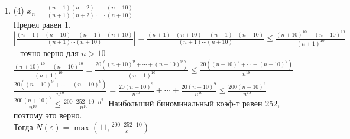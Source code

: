 \documentclass[a4paper]{article}
\def\eps{\varepsilon}
\begin{document}
\begin{enumerate}
\begin{enumerate}
        С $n > 10$ точно выполняется, что знаменатель > 1, поэтому:
        $\ 2|\frac{1 - \sqrt[3]{1 + \frac{2}{n} - \frac{1}{n^2}} + 1 - \sqrt[3]{1 - \frac{1}{n^2}} + 1 - \sqrt[3]{1 - \frac{2}{n} - \frac{1}{n^2}}}{3(\sqrt[3]{1 + \frac{2}{n} - \frac{1}{n^2}} + \sqrt[3]{1 - \frac{1}{n^2}} + \sqrt[3]{1 - \frac{2}{n} - \frac{1}{n^2}})}| \le
        2|1 - \sqrt[3]{1 + \frac{2}{n} - \frac{1}{n^2}} + 1 - \sqrt[3]{1 - \frac{1}{n^2}} + 1 - \sqrt[3]{1 - \frac{2}{n} - \frac{1}{n^2}}| \le
        2|3 - \sqrt[3]{1 + \frac{2}{n} - \frac{1}{n^2}}| \le 2|3 - \sqrt[3]{1 + \frac{2}{n} -\frac{1}{n^2}}| \le
        2|3 + \sqrt[3]{\frac{1}{n^2}}|$. $2|3 + \sqrt[3]{\frac{1}{n^2}}| < \eps \Leftrightarrow
        3 + \sqrt[3]{\frac{1}{n^2}} < \frac{\eps}{2} \Leftrightarrow \frac{1}{n^2} < (\frac{\eps}{2} - 3)^3$. При $\eps \ge \frac{3}{2}$ можно брать $n = 10$ и все будет хорошо. Дальше рассматриваем $\eps < \frac{3}{2}$
        \item (4) $x_n = \frac{(n-1)(n-2)\cdot\dots\cdot (n-10)}{(n+1)(n+2)\cdot\dots\cdot(n+10)}$\\
        Предел равен 1.\\
        $|\frac{(n-1)\cdots(n-10) - (n+1)\cdots(n+10)}{(n+1)\cdots(n+10)}| = \frac{(n+1)\cdots(n+10) - (n-1)\cdots(n-10)}{(n+1)\cdots(n+10)} \le \frac{(n+10)^{10} - (n-10)^{10}}{(n+1)^{10}}$ -- точно верно для $n > 10$\\
        $\frac{(n+10)^{10} - (n-10)^{10}}{(n+1)^{10}} = \frac{20((n+10)^9 + \cdots + (n-10)^9)}{(n+1)^{10}} \le \frac{20((n+10)^9 + \cdots + (n-10)^9)}{n^{10}}$\\
        $\frac{20((n+10)^9 + \cdots + (n-10)^9)}{n^{10}} = \frac{20(n+10)^9}{n^{10}} + \cdots + \frac{20(n-10)^9}{n^{10}} \le \frac{200(n+10)^9}{n^{10}}$\\
        $\frac{200(n+10)^9}{n^{10}} \le \frac{200\cdot 252 \cdot 10 \cdot n^9}{n^{10}}$\ Наибольший биноминальный коэф-т равен 252, поэтому это верно.\\
        Тогда $N(\eps) = \max(11, \frac{200\cdot 252 \cdot 10}{\eps})$    
    \end{enumerate}
    

\end{enumerate}
\end{document}
